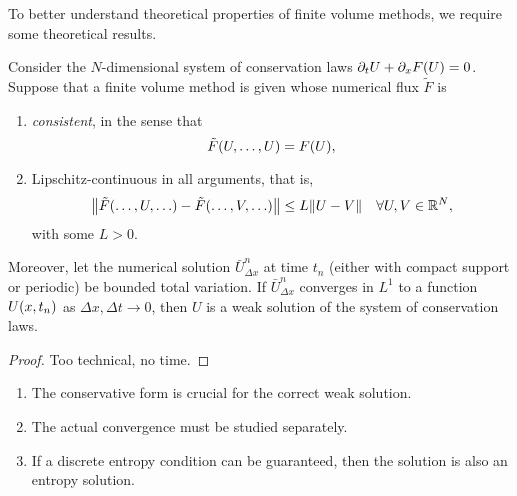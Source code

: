 To better understand theoretical properties of finite volume methods, we require some theoretical results.

\begin{theorem}
	Consider the \(N\)-dimensional system of conservation laws \(\partial_t U + \partial_x F\parentheses*{U} = 0\). Suppose that a finite volume method is given whose numerical flux \(\tilde{F}\) is
	\begin{enumerate}
		\item \emph{consistent}, in the sense that
		\[
			\tilde{F}\parentheses*{U, \ldots, U} = F\parentheses*{U},
		\]
		\item Lipschitz-continuous in all arguments, that is,
		\[
			\norm*{\tilde{F}\parentheses*{\ldots, U, \ldots} - \tilde{F}\parentheses*{\ldots, V, \ldots}} \le L\norm*{U - V} \quad \forall U, V \in \R^N,
		\]
		with some \(L > 0\).
	\end{enumerate}
	Moreover, let the numerical solution \(\bar{U}_{\Delta x}^n\) at time \(t_n\) (either with compact support or periodic) be bounded total variation.
	If \(\bar{U}_{\Delta x}^n\) converges in \(L^1\) to a function \(U\parentheses*{x, t_n}\) as \(\Delta x, \Delta t \to 0\), then \(U\) is a weak solution of the system of conservation laws.
\end{theorem}

\begin{proof}
	Too technical, no time.
\end{proof}

\begin{remark}
	\begin{enumerate}
		\item The conservative form is crucial for the correct weak solution.
		\item The actual convergence must be studied separately.
		\item If a discrete entropy condition can be guaranteed, then the solution is also an entropy solution.
	\end{enumerate}
\end{remark}

